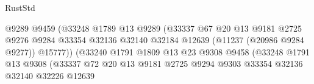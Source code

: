 \begin{lexlean}{RustStd}
\begin{coremodule}
                                                @9289
                                                @9459
                                                (@33248
                                                  @1789
                                                  @13
                                                  @9289
                                                  (@33337
                                                    @67
                                                    @20
                                                    @13
                                                    @9181
                                                    @2725
                                                    @9276
                                                    @9284
                                                    @33354
                                                    @32136
                                                    @32140
                                                    @32184
                                                    @12639
                                                    (@11237 (@20986 @9284 @9277))
                                                    @15777))
                                                (@33240
                                                  @1791
                                                  @1809
                                                  @13
                                                  @23
                                                  @9308
                                                  @9458
                                                  (@33248
                                                    @1791
                                                    @13
                                                    @9308
                                                    (@33337
                                                      @72
                                                      @20
                                                      @13
                                                      @9181
                                                      @2725
                                                      @9294
                                                      @9303
                                                      @33354
                                                      @32136
                                                      @32140
                                                      @32226
                                                      @12639

\end{coremodule}
\end{lexlean}
